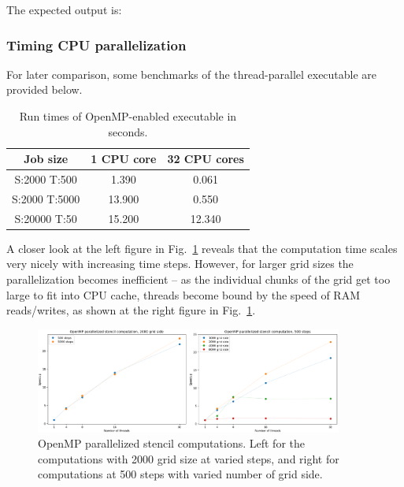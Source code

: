 The expected output is:



\subsubsection{Timing CPU parallelization}


\par
For later comparison, some benchmarks of the thread-parallel executable are provided below.

\begin{table}[!h]
\centering\caption{Run times of OpenMP-enabled executable in seconds.}\label{tbl:terminology}
\begin{tabular}{ |c|c|c| } 
\hline
\textbf{Job size} &  \textbf{1 CPU core} & \textbf{32 CPU cores} \\
\hline
S:2000 T:500 & 1.390 & 0.061 \\
S:2000 T:5000 & 13.900 & 0.550 \\
S:20000 T:50 & 15.200 & 12.340 \\
\hline
\end{tabular}
\end{table}


\par
A closer look at the left figure in Fig.~\ref{fig:heat_omp_step_gridside} reveals that the computation time scales very nicely with increasing time steps.
However, for larger grid sizes the parallelization becomes inefficient – as the individual chunks of the grid get too large to fit into CPU cache, threads become bound by the speed of RAM reads/writes, as shown at the right figure in Fig.~\ref{fig:heat_omp_step_gridside}.


\begin{figure}[!htbp]
\centering\includegraphics[width=0.9\textwidth]{fig_problem/heat_omp_step_gridside.png}
\caption{OpenMP parallelized stencil computations. Left for the computations with 2000 grid size at varied steps, and right for computations at 500 steps with varied number of grid side.}\label{fig:heat_omp_step_gridside}
\end{figure}


